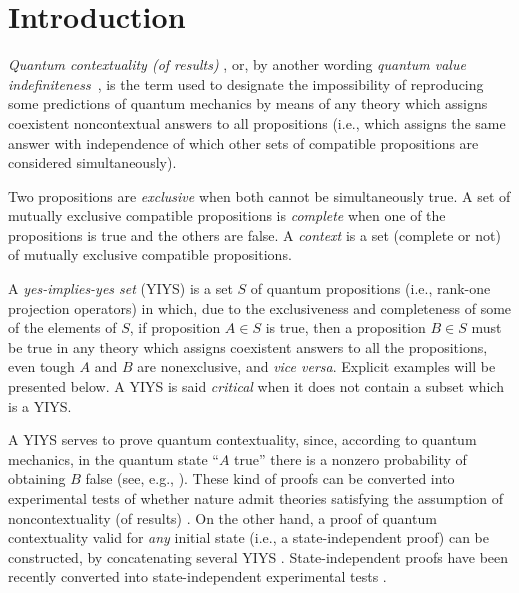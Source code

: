 \documentclass[twocolumn,aps,pra,showpacs]{revtex4-1}
\begin{document}

\section{Introduction}


{\em Quantum contextuality (of results)} \cite{Specker60, KS65,
Bell66, KS67},
or, by another wording {\em quantum value indefiniteness}~\cite{peres222},
is the term used to designate the impossibility
of reproducing some predictions of quantum mechanics by means
of any theory which assigns coexistent noncontextual answers to
all propositions (i.e., which assigns the same answer with
independence of which other sets of compatible propositions are
considered simultaneously).

Two propositions are {\em exclusive} when both cannot be
simultaneously true. A set of mutually exclusive compatible
propositions is {\em complete} when one of the propositions is
true and the others are false. A {\em context} is a set
(complete or not) of mutually exclusive compatible
propositions.

A {\em yes-implies-yes set} (YIYS) is a set $S$ of quantum
propositions (i.e., rank-one projection operators) in which,
due to the exclusiveness and completeness of some of the
elements of $S$, if proposition $A \in S$ is true, then a
proposition $B \in S$ must be true in any theory which assigns
coexistent answers to all the propositions, even tough $A$ and
$B$ are nonexclusive, and {\it vice versa}.
Explicit examples will be presented
below. A YIYS is said {\em critical} when it does not contain a
subset which is a YIYS.

A YIYS serves to prove quantum contextuality, since, according
to quantum mechanics, in the quantum state ``$A$ true'' there
is a nonzero probability of obtaining $B$ false (see, e.g.,
\cite{Stairs83, Clifton93, CG95}). These kind of proofs can be
converted into experimental tests of whether nature admit
theories satisfying the assumption of noncontextuality (of
results) \cite{CT10}. On the other hand, a proof of quantum
contextuality valid for {\em any} initial state (i.e., a
state-independent proof) can be constructed, by concatenating
several YIYS \cite{KS67, CG96}. State-independent proofs have
been recently converted into state-independent experimental
tests \cite{Cabello08, BBCP09, KZGKGCBR09, ARBC09, Cabello10}.
\end{document}
